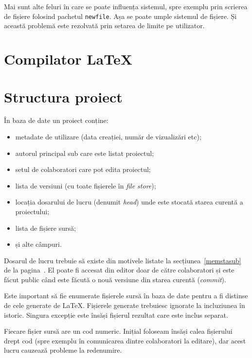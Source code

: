 \documentclass[a4wide,12pt]{report}
\newcommand{\eng}[1]{\emph{#1}} %
\newcommand{\cod}[1]{\texttt{#1}}
\newcommand{\acr}[1]{{\textsmaller[1]{\textsc{#1}}}} %
\begin{document}
Mai sunt alte feluri în care se poate influența sistemul, spre exemplu prin
scrierea de fișiere folosind pachetul \cod{newfile}. Așa se poate umple sistemul
de fișiere. Și această problemă este rezolvată prin setarea de limite pe
utilizator.

\section{Compilator \LaTeX}

\section{Structura proiect}

În baza de date un proiect conține:

\begin{itemize}

\item metadate de utilizare (data creației, număr de vizualizări etc);

\item autorul principal sub care este listat proiectul;

\item setul de colaboratori care pot edita proiectul;

\item lista de versiuni (cu toate fișierele în \eng{file store});

\item locația dosarului de lucru (denumit \eng{head}) unde este stocată starea
curentă a proiectului;

\item lista de fișiere sursă;

\item și alte câmpuri.

\end{itemize}

Dosarul de lucru trebuie să existe din motivele listate la
secțiunea~\ref{memstasub} de la pagina~\pageref{memstasub}. El poate fi accesat
din editor doar de către colaboratori și este făcut public când este făcută o
nouă versiune din starea curentă (\eng{commit}).

Este important să fie enumerate fișierele sursă în baza de date pentru a fi
distinse de cele generate de \LaTeX{}. Fișierele generate trebuiesc ignorate la
incluziunea în istoric. Singura excepție este însăși fișierul \acr{PDF} rezultat
care este inclus separat.

Fiecare fișier sursă are un cod numeric. Inițial foloseam însăși calea
fișierului drept cod (spre exemplu în comunicarea dintre colaboratori la
editare), dar acest lucru cauzează probleme la redenumire.
\end{document}
